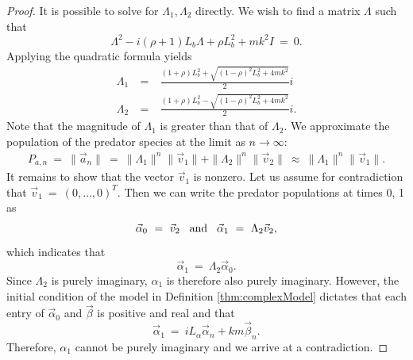 \documentclass[11pt,reqno]{amsart}
\numberwithin{equation}{section}
\theoremstyle{plain}
\begin{document}
\begin{proof}
    It is possible to solve for $\Lambda_1, \Lambda_2$ directly. 
We wish to find a matrix $\Lambda$ such that 
\begin{equation}
\Lambda^2 - i(\rho + 1) L_b \Lambda + \rho L_b^2+ mk^2 I \ = \ 0.
\end{equation}
    Applying the quadratic formula yields
    \begin{eqnarray}
        \Lambda_1 &\ = \ & 
        \frac {
        (1 + \rho) L_b^2 + 
        \sqrt{
        (1-\rho)^2L_b^2 + 4mk^2
        }
        } 2 i \nonumber \\ 
 \Lambda_2 & \ = \ &
        \frac {
        (1 + \rho) L_b^2 - 
        \sqrt{
        (1-\rho)^2L_b^2 + 4mk^2
        }
        } 2 i. 
    \end{eqnarray}
    Note that the magnitude of $\Lambda_1$ is greater than that of $\Lambda_2$. 
    We approximate the population of the predator species at the limit as $n \rightarrow \infty$: 
    \begin{eqnarray}
        P_{a, n} \ = \ \|\vec a_n\| \ = \ 
        \|\Lambda_1\|^n \|\vec v_1\| + 
 \|\Lambda_2\|^n \|\vec v_2\| 
 \ \approx  \ 
\|\Lambda_1\|^n \|\vec v_1\|.
    \end{eqnarray}
    It remains to show that the vector $\vec v_1$ is nonzero. Let us assume for contradiction that $\vec v_1 \ = \ (0, \dots, 0)^T$. Then we can write the predator populations at times 0, 1 as 
    \begin{equation}
    \vec \alpha_0 \ = \ \vec v_2 \hspace{3mm} \textrm{and} \hspace{3mm} \vec \alpha_1 \ = \ \Lambda_2 \vec v_2,
    \end{equation}
    which indicates that 
    \begin{equation}
    \vec \alpha_1 \ = \ \Lambda_2 \vec \alpha_0.
    \end{equation}
    Since $\Lambda_2$ is purely imaginary, $\alpha_1$ is therefore also purely imaginary. 
    However, the initial condition of the model in Definition \ref{thm:complexModel} 
    dictates that each entry of $\vec \alpha_0$ and $\vec \beta$ is positive and real and that 
    \begin{equation}
    \vec \alpha_1 \ = \ iL_{\alpha} \vec \alpha_n + km \vec\beta_n.
    \end{equation}
    Therefore, $\alpha_1 $ cannot be purely imaginary and we arrive at a contradiction. 
\end{proof}
\end{document}
